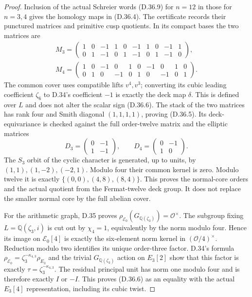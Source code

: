 \begin{proof}
Inclusion of the actual Schreier words (D.36.9) for $n=12$ in
those for $n=3,4$ gives the homology maps in (D.36.4). The
certificate records their punctured matrices and primitive cusp
quotients. In its compact bases the two matrices are
\[
 \begin{gathered}
 M_3=\begin{pmatrix}
 1&0&-1&1&0&-1&1&0&-1&1\\
 0&1&-1&0&1&-1&0&1&-1&0
 \end{pmatrix},\\[4pt]
 M_4=\begin{pmatrix}
 1&0&-1&0&1&0&-1&0&1&0\\
 0&1&0&-1&0&1&0&-1&0&1
 \end{pmatrix}.
 \end{gathered}                                      \tag{D.36.10}
\]
The common cover uses compatible lifts $v^4,v^3$; converting its
cubic leading coefficient $\zeta_6$ to D.34's coefficient $-1$
is exactly the deck map $\delta$. This is defined over $L$ and
does not alter the scalar sign (D.36.6).
The stack of the two matrices has rank four and Smith diagonal
$(1,1,1,1)$, proving (D.36.5). Its deck-equivariance is checked
against the full order-twelve matrix and the elliptic matrices
\[
 D_3=\begin{pmatrix}0&-1\\1&-1\end{pmatrix},\qquad
 D_4=\begin{pmatrix}0&-1\\1&0\end{pmatrix}.
                                                               \tag{D.36.11}
\]
The $S_3$ orbit of the cyclic character is generated, up to units,
by $(1,1),(1,-2),(-2,1)$. Modulo four their common kernel is zero.
Modulo twelve it is exactly
$\{(0,0),(4,8),(8,4)\}$. This proves the normal-core orders and
the actual quotient from the Fermat-twelve deck group. It does not
replace the smaller normal core by the full abelian cover.

For the arithmetic graph, D.35 proves
$\rho_{\mathcal E_0}(G_{\mathbb Q(\zeta_3)})=\mathcal O^\times$.
The subgroup fixing $L=\mathbb Q(\zeta_3,i)$ is cut out by
$\chi_4=1$, equivalently by the norm modulo four. Hence its image
on $\mathcal E_0[4]$ is exactly the six-element norm kernel in
$(\mathcal O/4)^\times$. Reduction modulo two identifies its
unique order-three factor. D.34's formula
$\rho_{\mathcal E_0}=\zeta_3^{-\kappa_{4,3}}\rho_{E_3}$ and
the trivial $G_{\mathbb Q(\zeta_3)}$ action on $E_3[2]$ show that
this factor is exactly $\tau=\zeta_3^{-\kappa_{4,3}}$.
The residual principal unit has norm one modulo four and is
therefore exactly $I$ or $-I$. This proves (D.36.6) as an equality
with the actual $E_3[4]$ representation, including its cubic twist.


\end{proof}
